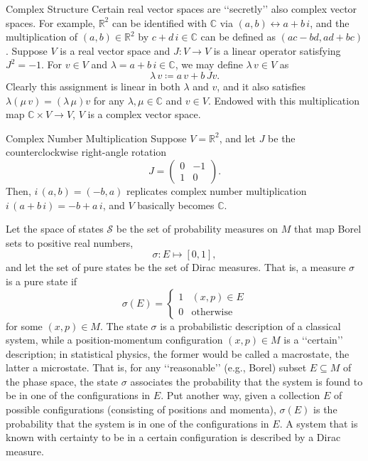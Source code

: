 \documentclass{amsart}
\newcommand{\R}{\mathbb{R}}
\newcommand{\C}{\mathbb{C}}
\newcommand{\dq}[1]{\lq\lq{#1}\rq\rq}
\newcommand{\cS}{\mathcal{S}}
\begin{document}
\begin{example}{Complex Structure} \label{subsec:complex_structure}
Certain real vector spaces are \dq{secretly} also complex vector spaces. For example, $\R^2$ can be identified with $\C$ via $(a, b) \leftrightarrow a + b \, i$, and the multiplication of $(a, b) \in \R^2$ by $c + d \, i \in \C$ can be defined as $(a c - b d, a d + b c)$. Suppose $V$ is a real vector space and $J: V \to V$ is a linear operator satisfying $J^2 = -1$. For $v \in V$ and $\lambda = a + b \, i \in \C$, we may define $\lambda \, v \in V$ as
\begin{equation*}
    \lambda \, v \coloneqq a \, v + b \, J v.
\end{equation*}
Clearly this assignment is linear in both $\lambda$ and $v$, and it also satisfies $\lambda (\mu \, v) = (\lambda \, \mu) v$ for any $\lambda, \mu \in \C$ and $v \in V$. Endowed with this multiplication map $\C \times V \to V$, $V$ is a complex vector space.
\end{example}

\begin{example}{Complex Number Multiplication}
Suppose $V = \R^2$, and let $J$ be the counterclockwise right-angle rotation
\begin{equation*}
J = \begin{pmatrix}
    0 & -1\\
    1 & 0
\end{pmatrix}.
\end{equation*}
Then, $i \, (a, b) = (-b, a)$ replicates complex number multiplication $i \, (a + b \, i) = -b + a\, i$, and $V$ basically becomes $\C$.
\end{example}

Let the space of states $\cS$ be the set of probability measures on $M$ that map Borel sets to positive real numbers,
\begin{equation*}
    \sigma: E \mapsto [0, 1],
\end{equation*}
and let the set of pure states be the set of Dirac measures. That is, a measure $\sigma$ is a pure state if
\begin{equation*}
    \sigma(E) = \begin{cases}
        1 & (x, p) \in E\\
        0 & \text{otherwise}
    \end{cases}
\end{equation*}
for some $(x, p) \in M$. The state $\sigma$ is a probabilistic description of a classical system, while a position-momentum configuration $(x, p) \in M$ is a \dq{certain} description; in statistical physics, the former would be called a macrostate, the latter a microstate. That is, for any \dq{reasonable} (e.g., Borel) subset $E \subseteq M$ of the phase space, the state $\sigma$ associates the probability that the system is found to be in one of the configurations in $E$. Put another way, given a collection $E$ of possible configurations (consisting of positions and momenta), $\sigma(E)$ is the probability that the system is in one of the configurations in $E$. A system that is known with certainty to be in a certain configuration is described by a Dirac measure.
\end{document}
